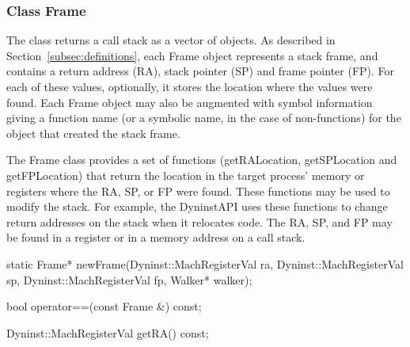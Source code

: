 \subsubsection{Class Frame}
\label{subsec:frame}

The  class returns a call stack as a vector of  objects. As described
in Section~\ref{subsec:definitions}, each Frame object represents a stack frame, and contains a
return address (RA), stack pointer (SP) and frame pointer (FP). For each of
these values, optionally, it stores the location where the values were found.
Each Frame object may also be augmented with symbol information giving a
function name (or a symbolic name, in the case of non-functions) for the object
that created the stack frame.

The Frame class provides a set of functions (getRALocation, getSPLocation and
getFPLocation) that return the location in the target process' memory or
registers where the RA, SP, or FP were found. These functions may be used to
modify the stack. For example, the DyninstAPI uses these functions to change
return addresses on the stack when it relocates code. The RA, SP, and FP may be
found in a register or in a memory address on a call stack.

\begin{apient}
static Frame* newFrame(Dyninst::MachRegisterVal ra,
                       Dyninst::MachRegisterVal sp,
                       Dyninst::MachRegisterVal fp,
                       Walker* walker);
\end{apient}

\begin{apient}
bool operator==(const Frame &) const;
\end{apient}


\begin{apient}
Dyninst::MachRegisterVal getRA() const;
\end{apient}


